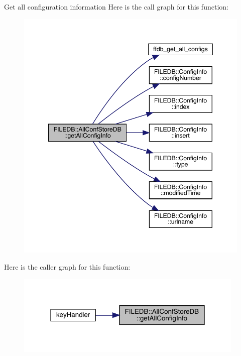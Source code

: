 Get all configuration information Here is the call graph for this function\+:
\nopagebreak
\begin{figure}[H]
\begin{center}
\leavevmode
\includegraphics[width=347pt]{df/db6/classFILEDB_1_1AllConfStoreDB_aeb8e6daf1a1f9b7a19899cf7db365632_cgraph}
\end{center}
\end{figure}
Here is the caller graph for this function\+:
\nopagebreak
\begin{figure}[H]
\begin{center}
\leavevmode
\includegraphics[width=309pt]{df/db6/classFILEDB_1_1AllConfStoreDB_aeb8e6daf1a1f9b7a19899cf7db365632_icgraph}
\end{center}
\end{figure}
\mbox{\label{classFILEDB_1_1AllConfStoreDB_aa923faf368f0aa7d327c2a3702d261c1}} 
